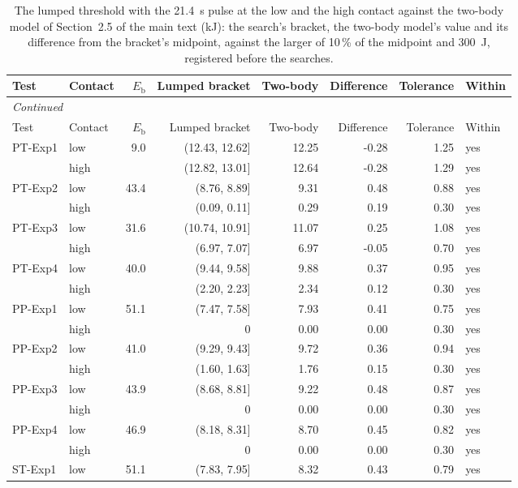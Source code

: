 {\footnotesize\setlength{\tabcolsep}{2.5pt}
\begin{longtable}{llrrrrrl}
\caption{The lumped threshold with the 21.4~s pulse at the low and the high contact against the two-body model of Section~2.5 of the main text (kJ): the search's bracket, the two-body model's value and its difference from the bracket's midpoint, against the larger of 10\,\% of the midpoint and 300~J, registered before the searches.}\label{tab:s-twobody}\\
\toprule
Test & Contact & $E_\mathrm{b}$ & Lumped bracket & Two-body & Difference & Tolerance & Within \\
\midrule
\endfirsthead
\multicolumn{8}{l}{\textit{Continued}} \\
\toprule
Test & Contact & $E_\mathrm{b}$ & Lumped bracket & Two-body & Difference & Tolerance & Within \\
\midrule
\endhead
PT-Exp1 & low & 9.0 & (12.43, 12.62] & 12.25 & -0.28 & 1.25 & yes \\
 & high &  & (12.82, 13.01] & 12.64 & -0.28 & 1.29 & yes \\
PT-Exp2 & low & 43.4 & (8.76, 8.89] & 9.31 & 0.48 & 0.88 & yes \\
 & high &  & (0.09, 0.11] & 0.29 & 0.19 & 0.30 & yes \\
PT-Exp3 & low & 31.6 & (10.74, 10.91] & 11.07 & 0.25 & 1.08 & yes \\
 & high &  & (6.97, 7.07] & 6.97 & -0.05 & 0.70 & yes \\
PT-Exp4 & low & 40.0 & (9.44, 9.58] & 9.88 & 0.37 & 0.95 & yes \\
 & high &  & (2.20, 2.23] & 2.34 & 0.12 & 0.30 & yes \\
PP-Exp1 & low & 51.1 & (7.47, 7.58] & 7.93 & 0.41 & 0.75 & yes \\
 & high &  & 0 & 0.00 & 0.00 & 0.30 & yes \\
PP-Exp2 & low & 41.0 & (9.29, 9.43] & 9.72 & 0.36 & 0.94 & yes \\
 & high &  & (1.60, 1.63] & 1.76 & 0.15 & 0.30 & yes \\
PP-Exp3 & low & 43.9 & (8.68, 8.81] & 9.22 & 0.48 & 0.87 & yes \\
 & high &  & 0 & 0.00 & 0.00 & 0.30 & yes \\
PP-Exp4 & low & 46.9 & (8.18, 8.31] & 8.70 & 0.45 & 0.82 & yes \\
 & high &  & 0 & 0.00 & 0.00 & 0.30 & yes \\
ST-Exp1 & low & 51.1 & (7.83, 7.95] & 8.32 & 0.43 & 0.79 & yes \\

\end{longtable}}
